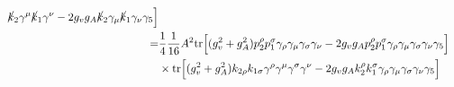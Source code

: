 \documentclass[11pt]{article}
\begin{document}
\begin{flushleft}
\begin{align*}
\cancel{k}_2 \gamma^{\mu} 
 \cancel{k}_1 \gamma^{\nu} 
- 2 g_v g_A 
\cancel{k}_2 
\gamma_{\mu} \cancel{k}_1 
\gamma_{\nu} \gamma_5
\Big] \\
=& \frac{1}{4} \frac{1}{16} A^2 \text{tr}
\Big[
 (g_v^2 + g_A^2)p_2^{\rho} p_1^{\sigma} \gamma_{\rho} 
\gamma_{\mu} 
 \gamma_{\sigma}
\gamma_{\nu} 
- 2 g_v g_A 
p_2^{\rho}  p_1^{\sigma} \gamma_{\rho} \gamma_{\mu}\gamma_{\sigma} \gamma_{\nu} \gamma_5
\Big]\\
&\times \text{tr} \Big[
(g_v^2 + g_A^2) k_{2 \rho} k_{1 \sigma} \gamma^{\rho} \gamma^{\mu} 
 \gamma^{\sigma} \gamma^{\nu}
 - 2 g_v g_A 
k_2^{ \rho} k_1^{ \sigma} \gamma_{\rho}
\gamma_{\mu}  \gamma_{\sigma}
\gamma_{\nu} \gamma_5 
\Big]\\
\end{align*}




\end{flushleft}
\end{document}
